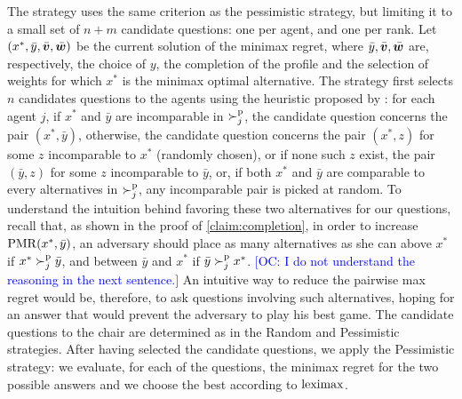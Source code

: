 \documentclass[sigconf, anonymous]{aamas}
\newcommand{\commentOC}[1]{\textcolor{blue}{\small$\big[$OC: #1$\big]$}}
\begin{document}
The  strategy uses the same criterion as the pessimistic strategy, but limiting it to a small set of $n + m$ candidate questions: one per agent, and one per rank. Let $(x^{*},\bar{y}, \bar{\bm{v}}, \bar{\bm{w}})$ be the current solution of the minimax regret, where $\bar{y}, \bar{\bm{v}}, \bar{\bm{w}}$ are, respectively, the choice of $y$, the completion of the profile and the selection of weights for which $x^{*}$ is the minimax optimal alternative. 
The  strategy first selects $n$ candidates questions to the agents using the heuristic proposed by \citet{Lu2011}: for each agent $j$, if $x^*$ and $\bar{y}$ are incomparable in $\succ^\text{p}_j$, the candidate question concerns the pair $(x^*, \bar{y})$, otherwise, the candidate question concerns the pair $(x^*, z)$ for some $z$ incomparable to $x^*$ (randomly chosen), or if none such $z$ exist, the pair $(\bar{y}, z)$ for some $z$ incomparable to $\bar{y}$, or, if both $x^*$ and $\bar{y}$ are comparable to every alternatives in $\succ^\text{p}_j$, any incomparable pair is picked at random. 
To understand the intuition behind favoring these two alternatives for our questions, recall that, as shown in the proof of \cref{claim:completion}, in order to increase $\operatorname{PMR}(x^{*},\bar{y})$, an adversary should place as many alternatives as she can above $x^{*}$ if $x^* \succ^\text{p}_j \bar{y}$, and between $\bar{y}$ and $x^{*}$ if $\bar{y} \succ^\text{p}_j x^*$. 
\commentOC{I do not understand the reasoning in the next sentence.}
An intuitive way to reduce the pairwise max regret would be, therefore, to ask questions involving such alternatives, hoping for an answer that would prevent the adversary to play his best game. 
The candidate questions to the chair are determined as in the Random and Pessimistic strategies.
After having selected the candidate questions, we apply the Pessimistic strategy: we evaluate, for each of the questions, the minimax regret for the two possible answers and we choose the best according to $\operatorname{leximax}$.
\end{document}
